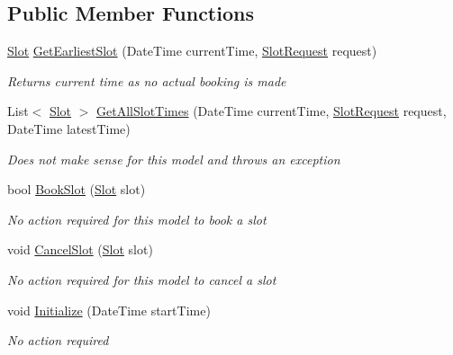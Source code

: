 \subsection*{Public Member Functions}
\begin{DoxyCompactItemize}
\item 
\hyperlink{class_general_health_care_elements_1_1_booking_models_1_1_slot}{Slot} \hyperlink{class_general_health_care_elements_1_1_booking_models_1_1_immediate_booking_model_aea2a19489b4b11af068edcb0d51facbd}{Get\+Earliest\+Slot} (Date\+Time current\+Time, \hyperlink{class_general_health_care_elements_1_1_booking_models_1_1_slot_request}{Slot\+Request} request)
\begin{DoxyCompactList}\small\item\em Returns current time as no actual booking is made \end{DoxyCompactList}\item 
List$<$ \hyperlink{class_general_health_care_elements_1_1_booking_models_1_1_slot}{Slot} $>$ \hyperlink{class_general_health_care_elements_1_1_booking_models_1_1_immediate_booking_model_a3f2e17145ff1cb42509ae85c9ce095f7}{Get\+All\+Slot\+Times} (Date\+Time current\+Time, \hyperlink{class_general_health_care_elements_1_1_booking_models_1_1_slot_request}{Slot\+Request} request, Date\+Time latest\+Time)
\begin{DoxyCompactList}\small\item\em Does not make sense for this model and throws an exception \end{DoxyCompactList}\item 
bool \hyperlink{class_general_health_care_elements_1_1_booking_models_1_1_immediate_booking_model_ad366961ddc51b565e927f09d9b18d8dd}{Book\+Slot} (\hyperlink{class_general_health_care_elements_1_1_booking_models_1_1_slot}{Slot} slot)
\begin{DoxyCompactList}\small\item\em No action required for this model to book a slot \end{DoxyCompactList}\item 
void \hyperlink{class_general_health_care_elements_1_1_booking_models_1_1_immediate_booking_model_a2750e8a6e1cb0364058a5797304aaa40}{Cancel\+Slot} (\hyperlink{class_general_health_care_elements_1_1_booking_models_1_1_slot}{Slot} slot)
\begin{DoxyCompactList}\small\item\em No action required for this model to cancel a slot \end{DoxyCompactList}\item 
void \hyperlink{class_general_health_care_elements_1_1_booking_models_1_1_immediate_booking_model_abbf520c9263bef74df4d4bd255692002}{Initialize} (Date\+Time start\+Time)
\begin{DoxyCompactList}\small\item\em No action required \end{DoxyCompactList}\end{DoxyCompactItemize}


